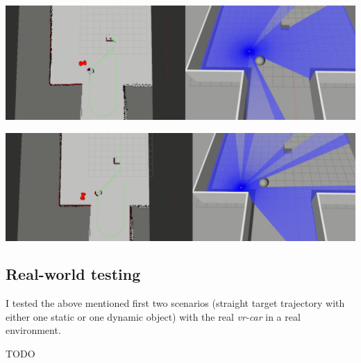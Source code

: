 \begin{center}
	\vspace{0.5cm}
	\includegraphics[width=\textwidth]{figures/raw/local_planner_test_curved_traj_2_static_objects_5.png}

	\vspace{0.5cm}
	\includegraphics[width=\textwidth]{figures/raw/local_planner_test_curved_traj_2_static_objects_6.png}

	\label{local_planner_test_curved_traj_2_static_objects}
\end{center}

\subsection{Real-world testing}
I tested the above mentioned first two scenarios (straight target trajectory with either one static or one dynamic object) with the real \textit{vr-car} in a real environment.

TODO